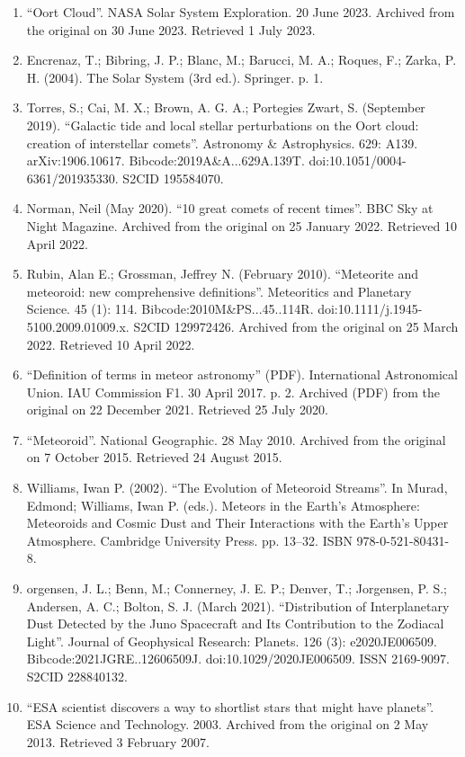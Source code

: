 \begin{enumerate}
\item ``Oort Cloud''. NASA Solar System Exploration. 20 June 2023. Archived from the original on 30 June 2023. Retrieved 1 July 2023.
\item Encrenaz, T.; Bibring, J. P.; Blanc, M.; Barucci, M. A.; Roques, F.; Zarka, P. H. (2004). The Solar System (3rd ed.). Springer. p. 1.
\item Torres, S.; Cai, M. X.; Brown, A. G. A.; Portegies Zwart, S. (September 2019). ``Galactic tide and local stellar perturbations on the Oort cloud: creation of interstellar comets''. Astronomy \& Astrophysics. 629: A139. arXiv:1906.10617. Bibcode:2019A\&A...629A.139T. doi:10.1051/0004-6361/201935330. S2CID 195584070.
\item Norman, Neil (May 2020). ``10 great comets of recent times''. BBC Sky at Night Magazine. Archived from the original on 25 January 2022. Retrieved 10 April 2022.
\item Rubin, Alan E.; Grossman, Jeffrey N. (February 2010). ``Meteorite and meteoroid: new comprehensive definitions''. Meteoritics and Planetary Science. 45 (1): 114. Bibcode:2010M\&PS...45..114R. doi:10.1111/j.1945-5100.2009.01009.x. S2CID 129972426. Archived from the original on 25 March 2022. Retrieved 10 April 2022.
\item ``Definition of terms in meteor astronomy'' (PDF). International Astronomical Union. IAU Commission F1. 30 April 2017. p. 2. Archived (PDF) from the original on 22 December 2021. Retrieved 25 July 2020.
\item ``Meteoroid''. National Geographic. 28 May 2010. Archived from the original on 7 October 2015. Retrieved 24 August 2015.
\item Williams, Iwan P. (2002). ``The Evolution of Meteoroid Streams''. In Murad, Edmond; Williams, Iwan P. (eds.). Meteors in the Earth's Atmosphere: Meteoroids and Cosmic Dust and Their Interactions with the Earth's Upper Atmosphere. Cambridge University Press. pp. 13–32. ISBN 978-0-521-80431-8.
\item orgensen, J. L.; Benn, M.; Connerney, J. E. P.; Denver, T.; Jorgensen, P. S.; Andersen, A. C.; Bolton, S. J. (March 2021). ``Distribution of Interplanetary Dust Detected by the Juno Spacecraft and Its Contribution to the Zodiacal Light''. Journal of Geophysical Research: Planets. 126 (3): e2020JE006509. Bibcode:2021JGRE..12606509J. doi:10.1029/2020JE006509. ISSN 2169-9097. S2CID 228840132.
\item ``ESA scientist discovers a way to shortlist stars that might have planets''. ESA Science and Technology. 2003. Archived from the original on 2 May 2013. Retrieved 3 February 2007.

\end{enumerate}
